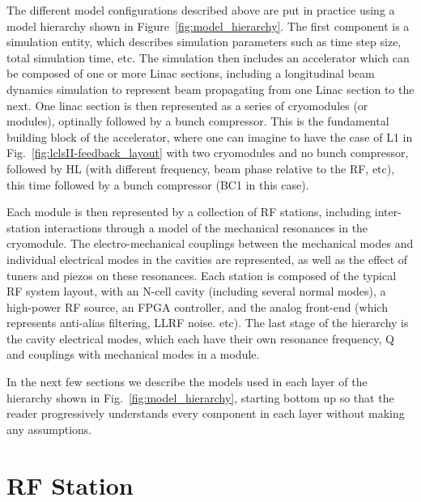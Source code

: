 \documentclass[a4paper,12pt]{article}
\begin{document}
The different model configurations described above are put in practice using a model hierarchy shown in Figure~\ref{fig:model_hierarchy}. The first component is a simulation entity, which describes simulation parameters such as time step size, total simulation time, etc. The simulation then includes an accelerator which can be composed of one or more Linac sections, including a longitudinal beam dynamics simulation to represent beam propagating from one Linac section to the next. One linac section is then represented as a series of cryomodules (or modules), optinally followed by a bunch compressor. This is the fundamental building block of the accelerator, where one can imagine to have the case of L1 in Fig.~\ref{fig:lclsII-feedback_layout} with two cryomodules and no bunch compressor, followed by HL (with different frequency, beam phase relative to the RF, etc), this time followed by a bunch compressor (BC1 in this case).

Each module is then represented by a collection of RF stations, including inter-station interactions through a model of the mechanical resonances in the cryomodule. The electro-mechanical couplings between the mechanical modes and individual electrical modes in the cavities are represented, as well as the effect of tuners and piezos on these resonances. Each station is composed of the typical RF system layout, with an N-cell cavity (including several normal modes), a high-power RF source, an FPGA controller, and the analog front-end (which represents anti-alias filtering, LLRF noise. etc). The last stage of the hierarchy is the cavity electrical modes, which each have their own resonance frequency, Q and couplings with mechanical modes in a module.

In the next few sections we describe the models used in each layer of the hierarchy shown in Fig.~\ref{fig:model_hierarchy}, starting bottom up so that the reader progressively understands every component in each layer without making any assumptions.

\newpage

\section{RF Station}
\end{document}
